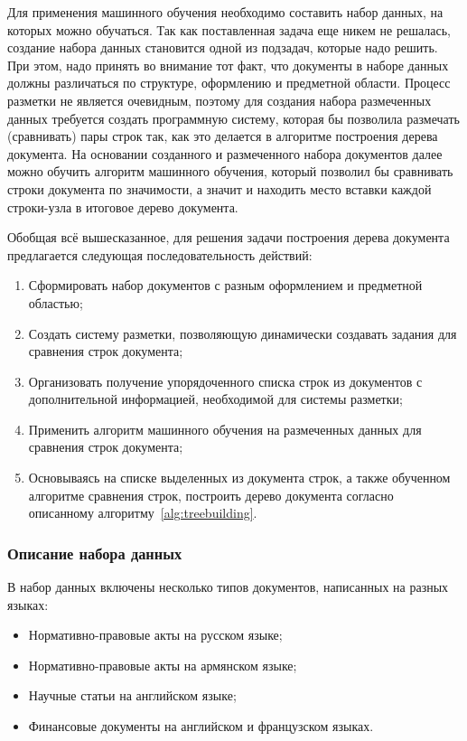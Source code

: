 Для применения машинного обучения необходимо составить набор данных, на которых можно обучаться.
Так как поставленная задача еще никем не решалась, создание набора данных становится одной из подзадач, которые надо решить.
При этом, надо принять во внимание тот факт, что документы в наборе данных должны различаться по структуре, оформлению и предметной области.
Процесс разметки не является очевидным, поэтому для создания набора размеченных данных требуется создать программную систему,
которая бы позволила размечать (сравнивать) пары строк так, как это делается в алгоритме построения дерева документа.
На основании созданного и размеченного набора документов далее можно обучить алгоритм машинного обучения,
который позволил бы сравнивать строки документа по значимости, а значит и находить место вставки каждой строки-узла в итоговое дерево документа.

Обобщая всё вышесказанное, для решения задачи построения дерева документа предлагается следующая последовательность действий:
\begin{enumerate}
    \item Сформировать набор документов с разным оформлением и предметной областью;
    \item Создать систему разметки, позволяющую динамически создавать задания для сравнения строк документа;
    \item Организовать получение упорядоченного списка строк из документов с дополнительной информацией, необходимой для системы разметки;
    \item Применить алгоритм машинного обучения на размеченных данных для сравнения строк документа;
    \item Основываясь на списке выделенных из документа строк, а также обученном алгоритме сравнения строк, построить дерево документа согласно описанному алгоритму~\ref{alg:treebuilding}.
\end{enumerate}

\subsubsection{Описание набора данных}

В набор данных включены несколько типов документов, написанных на разных языках:
\begin{itemize}
    \item Нормативно-правовые акты на русском языке;
    \item Нормативно-правовые акты на армянском языке;
    \item Научные статьи на английском языке;
    \item Финансовые документы на английском и французском языках.
\end{itemize}

